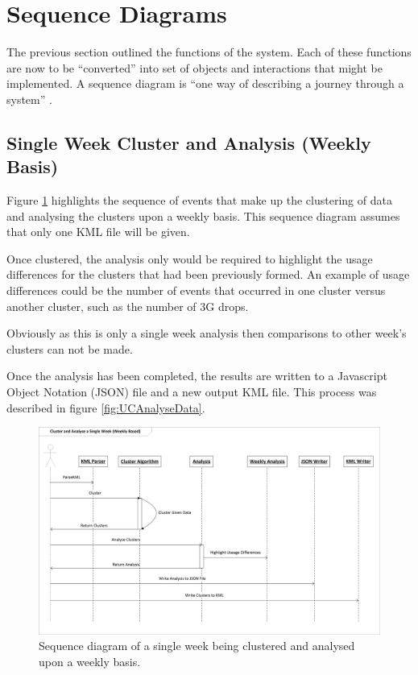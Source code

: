 \section{Sequence Diagrams}

The previous section outlined the functions of the system. Each of these 
functions are now to be ``converted'' into set of objects and interactions that 
might be implemented. A sequence diagram is ``one way of describing a journey 
through a system'' \citep{lunn03}.

\subsection{Single Week Cluster and Analysis (Weekly Basis)}
Figure \ref{fig:singleweekly} highlights the sequence of events that make up 
the clustering of data and analysing the clusters upon a weekly basis. This 
sequence diagram assumes that only one KML file will be given. 

Once clustered, the analysis only would be required to highlight the usage 
differences for the clusters that had been previously formed. An example of 
usage differences could be the number of events that occurred in one cluster 
versus another cluster, such as the number of 3G drops. 

Obviously as this is only a single week analysis then comparisons to other 
week's clusters can not be made.

Once the analysis has been completed, the results are written to a Javascript 
Object Notation (JSON) file and a new output KML file. This process was 
described in figure \ref{fig:UCAnalyseData}.

\begin{landscape}
  \centering 
  \begin{figure}
    \centering
      \includegraphics[scale=0.8]{chapter7/sequence_diagrams/single_week_cluster_weekly.png}
      \caption[Sequence diagram of a single week being clustered]
              {Sequence diagram of a single week being clustered and analysed 
              upon a weekly basis.}
      \label{fig:singleweekly}
  \end{figure}
\end{landscape}


